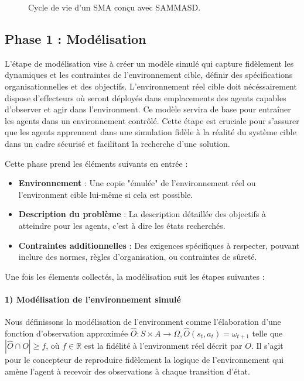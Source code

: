 \documentclass[sigconf,anonymous]{aamas}
\begin{document}
\begin{figure*}[h!]
  \centering
  
  \caption{Cycle de vie d'un SMA conçu avec SAMMASD.}
  \label{fig:cycle}
\end{figure*}

\subsection{Phase 1 : Modélisation}

L'étape de modélisation vise à créer un modèle simulé qui capture fidèlement les dynamiques et les contraintes de l'environnement cible, définir des spécifications organisationnelles et des objectifs. L'environnement réel cible doit nécéssairement dispose d'effecteurs où seront déployés dans emplacements des agents capables d'observer et agir dans l'environment. Ce modèle servira de base pour entraîner les agents dans un environnement contrôlé. Cette étape est cruciale pour s'assurer que les agents apprennent dans une simulation fidèle à la réalité du système cible dans un cadre sécurisé et facilitant la recherche d'une solution.

Cette phase prend les éléments suivants en entrée :
\begin{itemize}
    \item \textbf{Environnement} : Une copie "émulée" de l'environnement réel ou l'environment cible lui-même si cela est possible.
    \item \textbf{Description du problème} : La description détaillée des objectifs à atteindre pour les agents, c'est à dire les états recherchés.
    \item \textbf{Contraintes additionnelles} : Des exigences spécifiques à respecter, pouvant inclure des normes, règles d'organisation, ou contraintes de sûreté.
\end{itemize}

Une fois les élements collectés, la modélisation suit les étapes suivantes : 


\paragraph{\textbf{1) Modélisation de l'environnement simulé}} \quad

\noindent Nous définissons la modélisation de l'environment comme l'élaboration d'une fonction d'observation approximée $\hat{O}: S \times A \to \Omega, \hat{O}(s_t,a_t) = \omega_{t+1}$ telle que $|\hat{O} \cap O| \geq f$, où $f \in \mathbb{R}$ est la fidélité à l'environment réel décrit par $O$.
Il s'agit pour le concepteur de reproduire fidèlement la logique de l'environnement qui amène l'agent à recevoir des observations à chaque transition d'état. 
\end{document}
